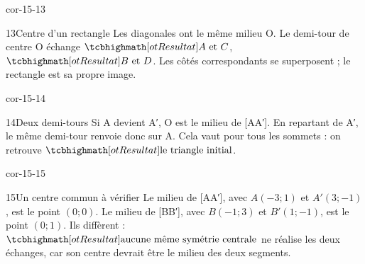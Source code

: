 \begin{blocLivre}{cor-15-13}\begin{corrige}{13}{Centre d’un rectangle}
Les diagonales ont le même milieu O. Le demi-tour de centre O échange $\res{A\text{ et }C}$, $\res{B\text{ et }D}$. Les côtés correspondants se superposent ; le rectangle est sa propre image.
\label{fig-cor-15-13}
\end{corrige}\end{blocLivre}
\begin{blocLivre}{cor-15-14}\begin{corrige}{14}{Deux demi-tours}
Si A devient A′, O est le milieu de [AA′]. En repartant de A′, le même demi-tour renvoie donc sur A. Cela vaut pour tous les sommets : on retrouve $\res{\text{le triangle initial}}$.
\label{fig-cor-15-14}
\end{corrige}\end{blocLivre}
\begin{blocLivre}{cor-15-15}\begin{corrige}{15}{Un centre commun à vérifier}
Le milieu de [AA′], avec $A(-3;1)$ et $A′(3;-1)$, est le point $(0;0)$. Le milieu de [BB′], avec $B(-1;3)$ et $B′(1;-1)$, est le point $(0;1)$. Ils diffèrent : $\res{\text{aucune même symétrie centrale}}$ ne réalise les deux échanges, car son centre devrait être le milieu des deux segments.
\label{fig-cor-15-15}
\end{corrige}\end{blocLivre}
